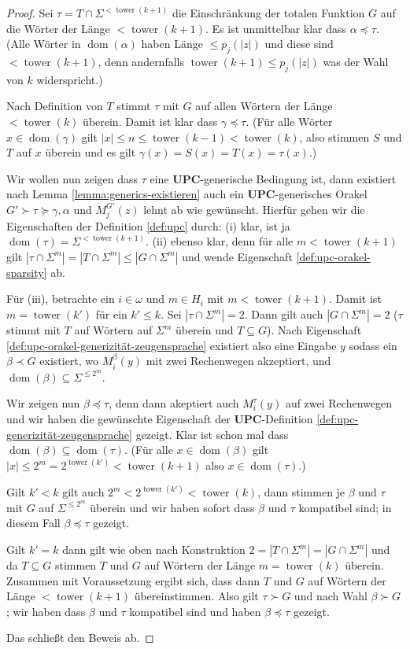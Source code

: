 \documentclass[nofonts]{uebung}
\theoremstyle{definition}
\DeclareMathOperator{\dom}{dom}
\DeclareMathOperator{\tower}{tower}
\begin{document}
\begin{proof}
    Sei $\tau=T\cap \Sigma^{<\tower(k+1)}$ die Einschränkung der totalen Funktion $G$ auf die Wörter der Länge $< \tower(k+1)$.
    Es ist unmittelbar klar dass $\alpha\preceq\tau$. (Alle Wörter in $\dom(\alpha)$ haben Länge $\leq p_j(|z|)$ und diese sind $<\tower(k+1)$, denn andernfalls $\tower(k+1)\leq p_j(|z|)$ was der Wahl von $k$ widerspricht.)

    Nach Definition von $T$ stimmt $\tau$ mit $G$ auf allen Wörtern der Länge $<\tower(k)$ überein.
    Damit ist klar dass $\gamma\preceq \tau$. (Für alle Wörter $x\in\dom(\gamma)$ gilt $|x|\leq n\leq \tower(k-1)<\tower(k)$, also stimmen $S$ und $T$ auf $x$ überein und es gilt $\gamma(x)=S(x)=T(x)=\tau(x)$.)
    
    Wir wollen nun zeigen dass $\tau$ eine $\mathbf{UPC}$-generische Bedingung ist, dann existiert nach Lemma \ref{lemma:generics-existieren} auch ein $\mathbf{UPC}$-generisches Orakel $G'\succ \tau\succeq \gamma,\alpha$ und $M_j^{G'}(z)$ lehnt ab wie gewünscht.
    Hierfür gehen wir die Eigenschaften der Definition \ref{def:upc} durch: (i) klar, ist ja $\dom(\tau)=\Sigma^{<\tower(k+1)}$.
    (ii) ebenso klar, denn für alle $m<\tower(k+1)$ gilt $|\tau\cap\Sigma^m|=|T\cap\Sigma^m|\leq |G\cap\Sigma^m|$ und wende Eigenschaft \ref{def:upc-orakel-sparsity} ab.

    Für (iii), betrachte ein $i\in\omega$ und $m\in H_i$ mit $m<\tower(k+1)$. Damit ist $m=\tower(k')$ für ein $k'\leq k$. Sei $|\tau\cap\Sigma^m|=2$.
    Dann gilt auch $|G\cap\Sigma^m|=2$ ($\tau$ stimmt mit $T$ auf Wörtern auf $\Sigma^m$ überein und $T\subseteq G$).
    Nach Eigenschaft \ref{def:upc-orakel-generizität-zeugensprache} existiert also eine Eingabe $y$ sodass ein $\beta\prec G$ existiert, wo $M_i^\beta(y)$ mit zwei Rechenwegen akzeptiert, und $\dom(\beta)\subseteq\Sigma^{\leq 2^m}$.

    Wir zeigen nun $\beta\preceq \tau$, denn dann akeptiert auch $M_i^\tau(y)$ auf zwei Rechenwegen und wir haben die gewünschte Eigenschaft der $\mathbf{UPC}$-Definition \ref{def:upc-generizität-zeugensprache} gezeigt.
    Klar ist schon mal dass $\dom(\beta)\subseteq\dom(\tau)$. (Für alle $x\in\dom(\beta)$ gilt $|x|\leq 2^m=2^{\tower(k')}<\tower(k+1)$ also $x\in\dom(\tau)$.)

    Gilt $k'<k$ gilt auch $2^m<2^{\tower(k')}<\tower(k)$, dann stimmen je $\beta$ und $\tau$ mit $G$ auf $\Sigma^{\leq 2^m}$ überein und wir haben sofort dass $\beta$ und $\tau$ kompatibel sind; in diesem Fall $\beta\preceq \tau$ gezeigt.

    Gilt $k'=k$ dann gilt wie oben nach Konstruktion $2=|T\cap\Sigma^m|=|G\cap\Sigma^m|$ und da $T\subseteq G$ stimmen $T$ und $G$ auf Wörtern der Länge $m=\tower(k)$ überein.
    Zusammen mit Voraussetzung ergibt sich, dass dann $T$ und $G$ auf Wörtern der Länge $<\tower(k+1)$ übereinstimmen.
    Also gilt $\tau\succ G$ und nach Wahl $\beta\succ G$; wir haben dass $\beta$ und $\tau$ kompatibel sind und haben $\beta\preceq\tau$ gezeigt.

    Das schließt den Beweis ab.
\end{proof}
\end{document}
